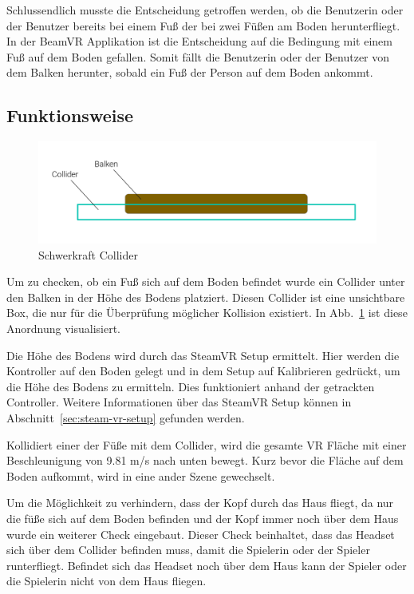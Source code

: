 Schlussendlich musste die Entscheidung getroffen werden, ob die Benutzerin oder der Benutzer bereits bei einem Fuß der bei zwei Füßen am Boden herunterfliegt.
In der BeamVR Applikation ist die Entscheidung auf die Bedingung mit einem Fuß auf dem Boden gefallen.
Somit fällt die Benutzerin oder der Benutzer von dem Balken herunter, sobald ein Fuß der Person auf dem Boden ankommt.

\subsection{Funktionsweise}\label{subsec:funktionsweise}

\begin{figure}
    \centering
    \includegraphics[scale=0.2]{pics/gravitation_collider}
    \caption{Schwerkraft Collider}
    \label{fig:gravitation-collider}
\end{figure}


Um zu checken, ob ein Fuß sich auf dem Boden befindet wurde ein Collider unter den Balken in der Höhe des Bodens platziert.
Diesen Collider ist eine unsichtbare Box, die nur für die Überprüfung möglicher Kollision existiert.
In Abb.~\ref{fig:gravitation-collider} ist diese Anordnung visualisiert.

Die Höhe des Bodens wird durch das SteamVR Setup ermittelt.
Hier werden die Kontroller auf den Boden gelegt und in dem Setup auf Kalibrieren gedrückt, um die Höhe des Bodens zu ermitteln.
Dies funktioniert anhand der getrackten Controller.
Weitere Informationen über das SteamVR Setup können in Abschnitt~\ref{sec:steam-vr-setup} gefunden werden.

Kollidiert einer der Füße mit dem Collider, wird die gesamte VR Fläche mit einer Beschleunigung von 9.81 m/s nach unten bewegt.
Kurz bevor die Fläche auf dem Boden aufkommt, wird in eine ander Szene gewechselt.

Um die Möglichkeit zu verhindern, dass der Kopf durch das Haus fliegt, da nur die füße sich auf dem Boden befinden und der Kopf immer noch über dem Haus wurde ein weiterer Check eingebaut.
Dieser Check beinhaltet, dass das Headset sich über dem Collider befinden muss, damit die Spielerin oder der Spieler runterfliegt.
Befindet sich das Headset noch über dem Haus kann der Spieler oder die Spielerin nicht von dem Haus fliegen.

